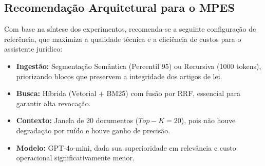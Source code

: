 \subsection{Recomendação Arquitetural para o MPES}

Com base na síntese dos experimentos, recomenda-se a seguinte configuração de referência, que maximiza a qualidade técnica e a eficiência de custos para o assistente jurídico:

\begin{itemize}
    \item \textbf{Ingestão:} Segmentação Semântica (Percentil 95) ou Recursiva (1000 tokens), priorizando blocos que preservem a integridade dos artigos de lei.
    \item \textbf{Busca:} Híbrida (Vetorial + BM25) com fusão por RRF, essencial para garantir alta revocação.
    \item \textbf{Contexto:} Janela de 20 documentos ($Top-K = 20$), pois não houve degradação por ruído e houve ganho de precisão.
    \item \textbf{Modelo:} GPT-4o-mini, dada sua superioridade em relevância e custo operacional significativamente menor.
\end{itemize}
